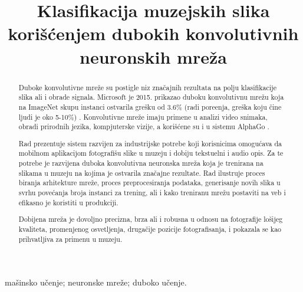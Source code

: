 \documentclass{simposium_srb_lat}
\begin{document}
\begin{frontmatter}
\vspace{20pt}

\title{Klasifikacija muzejskih slika kori\v s\' cenjem dubokih konvolutivnih neuronskih mre\v za}


\author{\textbf{ }}
\address{Matemati\v cki fakultet, Studentski Trg 16\\
}


\maketitle

\renewcommand{\abstractname}{Apstrakt.}
\renewcommand{\keywordsname}{Klju\v cne re\v ci}


\begin{abstract}
Duboke konvolutivne mre\v ze \cite{1} su postigle niz zna\v cajnih rezultata na polju klasifikacije
slika ali i obrade signala. Microsoft je 2015. prikazao duboku konvolutivnu mre\v zu koja na
ImageNet skupu instanci ostvarila gre\v sku od 3.6\%
(radi pore\dj enja, gre\v ska koju \v cine ljudi je oko 5-10\%) \cite{2}.
Konvolutivne mre\v ze imaju primene u analizi video snimaka, obradi prirodnih jezika,
kompjuterske vizije, a kori\v s\' cene su i u sistemu AlphaGo \cite{3}.

Rad prezentuje sistem razvijen za industrijske potrebe koji korisnicima
omogu\' cava da mobilnom aplikacijom fotografi\v su slike u muzeju i dobiju tekstuelni
i audio opis. Za te potrebe je razvijena duboka konvolutivna neuronska mre\v za
koja je trenirana na slikama u muzeju na kojima je ostvarila zna\v cajne rezultate.
Rad ilustruje proces biranja arhitekture mre\v ze, proces preprocesiranja podataka, generisanje
novih slika u svrhu pove\' canja broja instanci za trening, ali i kako treniranu mre\v zu postaviti
na veb i efikasno je koristiti u produkciji.

Dobijena mre\v za je dovoljno precizna, brza ali i robusna u odnosu na fotografije lo\v sijeg kvaliteta,
promenjenog osvetljenja, druga\v cije pozicije fotografisanja, i pokazala se kao prihvatljiva za primenu
u muzeju.

\end{abstract}
\begin{keyword}
ma\v sinsko u\v cenje; neuronske mre\v ze; duboko u\v cenje.
\end{keyword}
\end{frontmatter}
\end{document}

